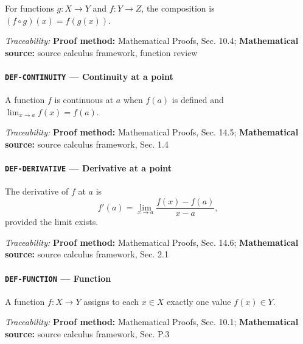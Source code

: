 \documentclass[10pt]{article}
\newcommand{\pidraw}[1]{\begingroup\urlstyle{tt}\nolinkurl{#1}\endgroup}
\theoremstyle{definition}
\theoremstyle{remark}
\begin{document}
For functions $g:X\to Y$ and $f:Y\to Z$, the composition is $(f\circ g)(x)=f(g(x))$.

\smallskip\noindent\textit{Traceability:} \textbf{Proof method:} Mathematical Proofs, Sec. 10.4; \textbf{Mathematical source:} source calculus framework, function review\par

\label{prf:DEF-CONTINUITY}

\paragraph{\pidraw{DEF-CONTINUITY} --- Continuity at a point}

A function $f$ is continuous at $a$ when $f(a)$ is defined and $\lim_{x\to a}f(x)=f(a)$.

\smallskip\noindent\textit{Traceability:} \textbf{Proof method:} Mathematical Proofs, Sec. 14.5; \textbf{Mathematical source:} source calculus framework, Sec. 1.4\par

\label{prf:DEF-DERIVATIVE}

\paragraph{\pidraw{DEF-DERIVATIVE} --- Derivative at a point}

The derivative of $f$ at $a$ is
\[
f'(a)=\lim_{x\to a}\frac{f(x)-f(a)}{x-a},
\]
provided the limit exists.

\smallskip\noindent\textit{Traceability:} \textbf{Proof method:} Mathematical Proofs, Sec. 14.6; \textbf{Mathematical source:} source calculus framework, Sec. 2.1\par

\label{prf:DEF-FUNCTION}

\paragraph{\pidraw{DEF-FUNCTION} --- Function}

A function $f:X\to Y$ assigns to each $x\in X$ exactly one value $f(x)\in Y$.

\smallskip\noindent\textit{Traceability:} \textbf{Proof method:} Mathematical Proofs, Sec. 10.1; \textbf{Mathematical source:} source calculus framework, Sec. P.3\par

\label{prf:DEF-INVERSE-FUNCTION}
\end{document}
